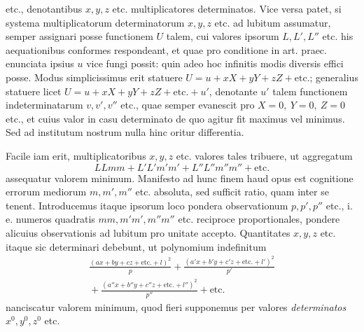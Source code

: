 etc., denotantibus \(x,y,z\) etc. multiplicatores determinatos. Vice versa patet, si systema multiplicatorum determinatorum \(x,y,z\) etc. ad lubitum assumatur, semper assignari posse functionem \(U\) talem, cui valores ipsorum \(L,L',L''\) etc. his aequationibus conformes respondeant, et quae pro conditione in art. praec. enunciata ipsius \(u\) vice fungi possit: quin adeo hoc infinitis modis diversis effici posse. Modus simplicissimus erit statuere \(U=u+xX+yY+zZ+\text{etc.}\); generalius statuere licet \(U=u+xX+yY+zZ+\text{etc.}+u'\), denotante \(u'\) talem functionem indeterminatarum \(v,v',v''\) etc., quae semper evanescit pro \(X=0,\ Y=0,\ Z=0\) etc., et cuius valor in casu determinato de quo agitur fit maximus vel minimus. Sed ad institutum nostrum nulla hinc oritur differentia.

Facile iam erit, multiplicatoribus \(x,y,z\) etc. valores tales tribuere, ut aggregatum
\[
LLmm+L'L'm'm'+L''L''m''m''+\text{etc.}
\]
assequatur valorem minimum. Manifesto ad hunc finem haud opus est cognitione errorum mediorum \(m,m',m''\) etc. absoluta, sed sufficit ratio, quam inter se tenent. Introducemus itaque ipsorum loco pondera observationum \(p,p',p''\) etc., i. e. numeros quadratis \(mm,m'm',m''m''\) etc. reciproce proportionales, pondere alicuius observationis ad lubitum pro unitate accepto. Quantitates \(x,y,z\) etc. itaque sic determinari debebunt, ut polynomium indefinitum
\[
\begin{gathered}
\frac{(ax+by+cz+\text{etc.}+l)^2}{p}+\frac{(a'x+b'y+c'z+\text{etc.}+l')^2}{p'}\\[4pt]
{}+\frac{(a''x+b''y+c''z+\text{etc.}+l'')^2}{p''}+\text{etc.}
\end{gathered}
\]
nanciscatur valorem minimum, quod fieri supponemus per valores \textit{determinatos} \(x^0,y^0,z^0\) etc.

